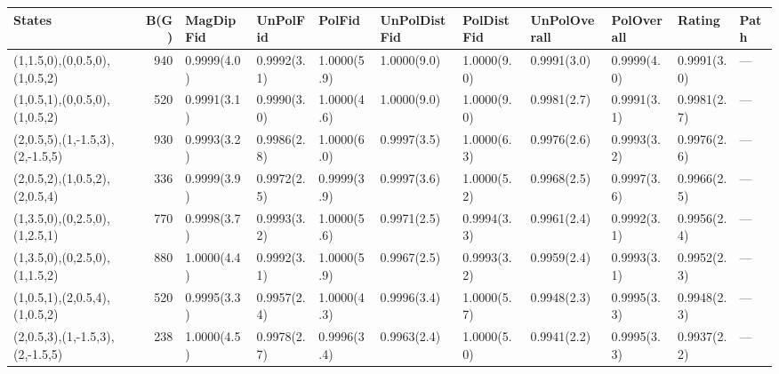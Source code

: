 \begin{tabular}{lrlllllllll}
\hline
 States                          &   B(G) & MagDipFid   & UnPolFid    & PolFid      & UnPolDistFid   & PolDistFid   & UnPolOverall   & PolOverall   & Rating      & Path   \\
\hline
 (1,1.5,0),(0,0.5,0),(1,0.5,2)   &    940 & 0.9999(4.0) & 0.9992(3.1) & 1.0000(5.9) & 1.0000(9.0)    & 1.0000(9.0)  & 0.9991(3.0)    & 0.9999(4.0)  & 0.9991(3.0) & ---    \\
 (1,0.5,1),(0,0.5,0),(1,0.5,2)   &    520 & 0.9991(3.1) & 0.9990(3.0) & 1.0000(4.6) & 1.0000(9.0)    & 1.0000(9.0)  & 0.9981(2.7)    & 0.9991(3.1)  & 0.9981(2.7) & ---    \\
 (2,0.5,5),(1,-1.5,3),(2,-1.5,5) &    930 & 0.9993(3.2) & 0.9986(2.8) & 1.0000(6.0) & 0.9997(3.5)    & 1.0000(6.3)  & 0.9976(2.6)    & 0.9993(3.2)  & 0.9976(2.6) & ---    \\
 (2,0.5,2),(1,0.5,2),(2,0.5,4)   &    336 & 0.9999(3.9) & 0.9972(2.5) & 0.9999(3.9) & 0.9997(3.6)    & 1.0000(5.2)  & 0.9968(2.5)    & 0.9997(3.6)  & 0.9966(2.5) & ---    \\
 (1,3.5,0),(0,2.5,0),(1,2.5,1)   &    770 & 0.9998(3.7) & 0.9993(3.2) & 1.0000(5.6) & 0.9971(2.5)    & 0.9994(3.3)  & 0.9961(2.4)    & 0.9992(3.1)  & 0.9956(2.4) & ---    \\
 (1,3.5,0),(0,2.5,0),(1,1.5,2)   &    880 & 1.0000(4.4) & 0.9992(3.1) & 1.0000(5.9) & 0.9967(2.5)    & 0.9993(3.2)  & 0.9959(2.4)    & 0.9993(3.1)  & 0.9952(2.3) & ---    \\
 (1,0.5,1),(2,0.5,4),(1,0.5,2)   &    520 & 0.9995(3.3) & 0.9957(2.4) & 1.0000(4.3) & 0.9996(3.4)    & 1.0000(5.7)  & 0.9948(2.3)    & 0.9995(3.3)  & 0.9948(2.3) & ---    \\
 (2,0.5,3),(1,-1.5,3),(2,-1.5,5) &    238 & 1.0000(4.5) & 0.9978(2.7) & 0.9996(3.4) & 0.9963(2.4)    & 1.0000(5.0)  & 0.9941(2.2)    & 0.9995(3.3)  & 0.9937(2.2) & ---    \\
\hline
\end{tabular}